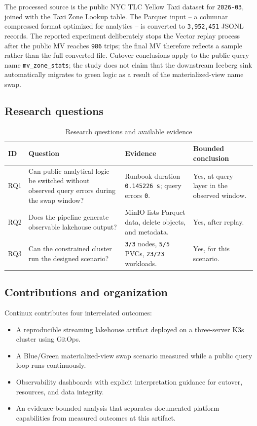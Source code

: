 The processed source is the public NYC TLC Yellow Taxi dataset for \texttt{2026-03}, joined with the Taxi Zone Lookup table. The Parquet input -- a columnar compressed format optimized for analytics -- is converted to \texttt{3,952,451} JSONL records. The reported experiment deliberately stops the Vector replay process after the public MV reaches \texttt{986} trips; the final MV therefore reflects a sample rather than the full converted file. Cutover conclusions apply to the public query name \texttt{mv\_zone\_stats}; the study does not claim that the downstream Iceberg sink automatically migrates to green logic as a result of the materialized-view name swap.

\subsection{Research questions}
\begin{table}[t!]
\centering
\caption{Research questions and available evidence}
\label{tab:rqs-en}
\begin{tabularx}{\textwidth}{@{}p{}Y Y Y@{}}
\toprule
\textbf{ID} & \textbf{Question} & \textbf{Evidence} & \textbf{Bounded conclusion}\\
\midrule
RQ1 & Can public analytical logic be switched without observed query errors during the swap window? & Runbook duration \texttt{0.145226 s}; query errors \texttt{0}. & Yes, at query layer in the observed window.\\
RQ2 & Does the pipeline generate observable lakehouse output? & MinIO lists Parquet data, delete objects, and metadata. & Yes, after replay.\\
RQ3 & Can the constrained cluster run the designed scenario? & \texttt{3/3} nodes, \texttt{5/5} PVCs, \texttt{23/23} workloads. & Yes, for this scenario.\\
\bottomrule
\end{tabularx}
\end{table}

\subsection{Contributions and organization}
Continux contributes four interrelated outcomes:

\begin{itemize}
\item A reproducible streaming lakehouse artifact deployed on a three-server K3s cluster using GitOps.
\item A Blue/Green materialized-view swap scenario measured while a public query loop runs continuously.
\item Observability dashboards with explicit interpretation guidance for cutover, resources, and data integrity.
\item An evidence-bounded analysis that separates documented platform capabilities from measured outcomes at this artifact.
\end{itemize}

